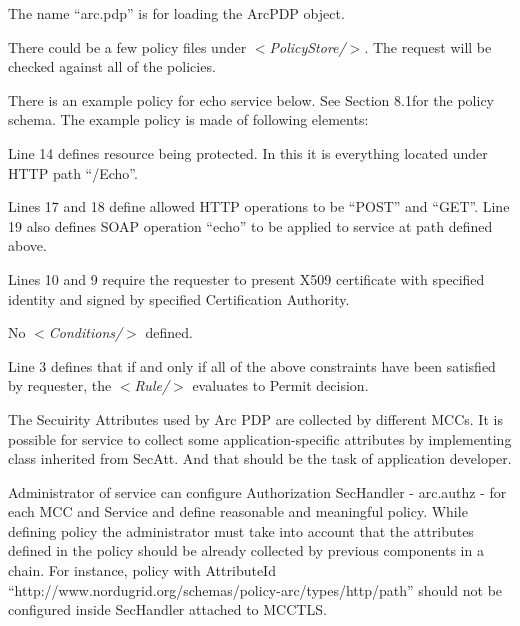 \documentclass{article}                            %
\begin{document}
The name ``arc.pdp'' is for loading the ArcPDP object.

There could be a few policy files under \textit{$<$PolicyStore/$>$}. The request will be checked against all of the policies.

There is an example policy for echo service below. See Section 8.1for the policy schema. The example policy is  made of following elements:

  \begin{list}{.}
  {\setlength{\rightmargin}{\leftmargin}}
    \item Line 14  defines resource being protected. In this it is everything located under HTTP path ``/Echo''.
    \item Lines 17 and 18 define allowed HTTP operations to be ``POST'' and ``GET''. Line 19 also defines SOAP operation ``echo'' to be applied to service at path defined above.
    \item Lines 10 and 9 require the requester to present X509 certificate with specified identity and signed by specified Certification Authority.
    \item No \textit{$<$Conditions/$>$} defined.
    \item Line 3 defines that if and only if all of the above constraints have been satisfied by requester, the \textit{$<$Rule/$>$} evaluates to Permit decision.
  \end{list}

The Secuirity Attributes used by Arc PDP are collected by different MCCs. It is possible for service to collect some application-specific attributes by implementing class inherited from SecAtt. And that should be the task of application developer.

Administrator of service can configure Authorization SecHandler - arc.authz - for each MCC and Service and define reasonable and meaningful policy. While defining policy the administrator must take into account that the attributes defined in the policy should be already collected by previous components in a chain. For instance, policy with AttributeId ``http://www.nordugrid.org/schemas/policy-arc/types/http/path'' should not be configured inside SecHandler attached to MCCTLS.
\end{document}
